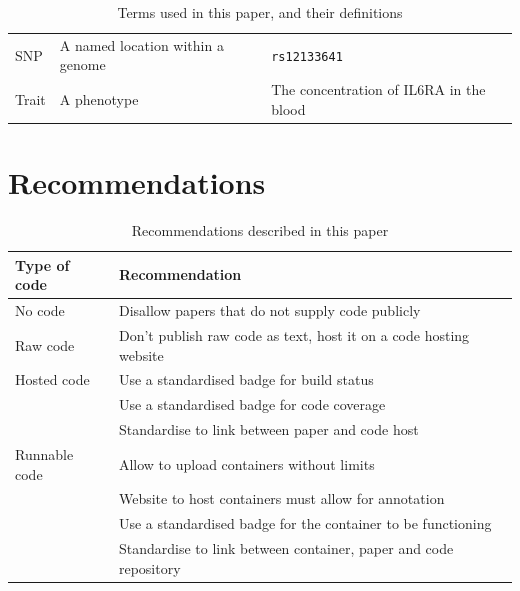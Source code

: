 \begin{table}[h]
\begin{tabular}{|l|p{5cm}|p{5cm}|}
    SNP          & A named location within a genome                                             & \verb|rs12133641|                                               \\
    Trait        & A phenotype                                                                  & The concentration of IL6RA in the blood                         \\
    \hline
  \end{tabular}
  \caption{Terms used in this paper, and their definitions}
  \label{tab:definitions}
\end{table}

\section*{Recommendations}

\begin{table}[h]
  \begin{tabular}{|p{2cm}|l|}
    \hline
    \textbf{Type of code} & \textbf{Recommendation} \\
    \hline
    No code       & Disallow papers that do not supply code publicly \\
    \hline
    Raw code      & Don't publish raw code as text, host it on a code hosting website \\
    \hline
    Hosted code   & Use a standardised badge for build status \\
                  & Use a standardised badge for code coverage \\
                  & Standardise to link between paper and code host \\
    \hline
    Runnable code & Allow to upload containers without limits \\
                  & Website to host containers must allow for annotation \\
                  & Use a standardised badge for the container to be functioning  \\
                  & Standardise to link between container, paper and code repository \\
    \hline
  \end{tabular}
  \caption{Recommendations described in this paper}
  \label{tab:recommendations}
\end{table}


\fi
